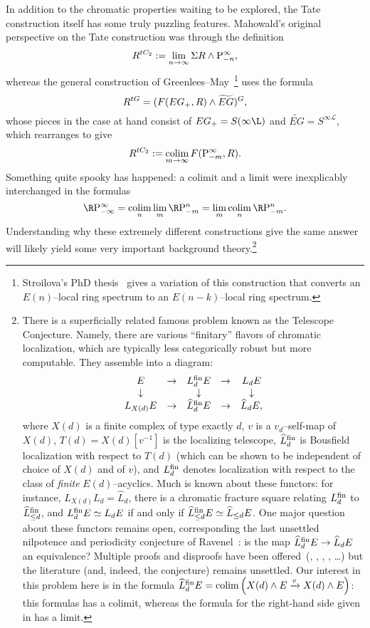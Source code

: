 In addition to the chromatic properties waiting to be explored, the Tate construction itself has some truly puzzling features.  Mahowald's original perspective on the Tate construction was through the definition \[R^{tC_2} := \lim_{n \to \infty} \Sigma R \wedge \mathrm P^\infty_{-n},\] whereas the general construction of Greenlees--May~\cite{GreenleesMay}\footnote{Stroilova's PhD thesis~\cite{Stroilova} gives a variation of this construction that converts an \(E(n)\)--local ring spectrum to an \(E(n-k)\)--local ring spectrum.} uses the formula \[R^{tG} = (F(EG_+, R) \wedge \widetilde{EG})^G,\] whose pieces in the case at hand consist of \(EG_+ = S(\infty \L)\) and \(\widetilde{EG} = S^{\infty \mathcal L}\), which rearranges to give \[R^{tC_2} := \operatorname*{colim}_{m \to \infty} F(\mathrm P^\infty_{-m}, R).\]  Something quite spooky has happened: a colimit and a limit were inexplicably interchanged in the formulas \[\RP^\infty_{-\infty} = \colim_n \lim_m \RP^n_{-m} = \lim_m \colim_n \RP^n_{-m}.\]  Understanding why these extremely different constructions give the same answer will likely yield some very important background theory.\footnote{There is a superficially related famous problem known as the Telescope Conjecture.  Namely, there are various ``finitary'' flavors of chromatic localization, which are typically less categorically robust but more computable.  They assemble into a diagram:
\[\begin{array}{ccccc}
E & \to & L_d^{\mathrm{fin}} E & \to & L_d E \\
\downarrow & & \downarrow & & \downarrow \\
L_{X(d)} E & \to & \widehat L_d^{\mathrm{fin}} E & \to & \widehat L_d E,
\end{array}\]
where \(X(d)\) is a finite complex of type exactly \(d\), \(v\) is a \(v_d\)--self-map of \(X(d)\), \(T(d) = X(d)[v^{-1}]\) is the localizing telescope, \(\widehat L_d^{\mathrm{fin}}\) is Bousfield localization with respect to \(T(d)\) (which can be shown to be independent of choice of \(X(d)\) and of \(v\)), and \(L_d^{\mathrm{fin}}\) denotes localization with respect to the class of \emph{finite} \(E(d)\)--acyclics.  Much is known about these functors: for instance, \(L_{X(d)} L_d = \widehat L_d\), there is a chromatic fracture square relating \(L_d^{\mathrm{fin}}\) to \(\widehat L_{\le d}^{\mathrm{fin}}\), and \(L_d^{\mathrm{fin}} E \simeq L_d E\) if and only if \(\widehat L_{\le d}^{\mathrm{fin}} E \simeq \widehat L_{\le d} E\).  One major question about these functors remains open, corresponding the last unsettled nilpotence and periodicity conjecture of Ravenel~\cite[Conjecture 10.5]{RavenelLocalizationWRTPeriodic}: is the map \(\widehat L_d^{\mathrm{fin}} E \to \widehat L_d E\) an equivalence?  Multiple proofs and disproofs have been offered~(\cite{RavenelObit}, \cite{MahowaldSadofsky}, \cite{Krause}, \cite{MRS}, \ldots) but the literature (and, indeed, the conjecture) remains unsettled.  Our interest in this problem here is in the formula \(\widehat L_d^{\mathrm{fin}} E = \operatorname*{colim}\left(X(d) \wedge E \xrightarrow{v} X(d) \wedge E\right)\): this formulas has a colimit, whereas the formula for the right-hand side given in  has a limit.}

